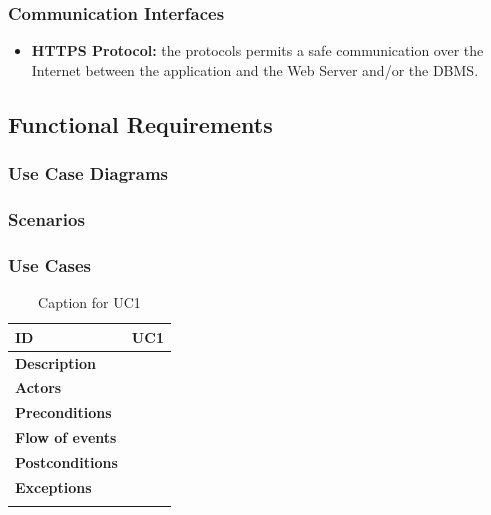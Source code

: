 \documentclass {article}
\begin{document}
	\subsubsection{Communication Interfaces}
	\begin{itemize}
		\item {\bf HTTPS Protocol:} the protocols permits a safe communication over the Internet between the application and the Web Server and/or the DBMS.
	\end{itemize}
	\subsection{Functional Requirements}
	\subsubsection{Use Case Diagrams}
	\subsubsection{Scenarios}
	\subsubsection{Use Cases}
	
	\begin{longtable}{| p{3 cm} | p{8.5 cm} |} 
			\hline
			{\bf ID} & UC1 \\
			\hline
			{\bf Description} & \\
			\hline
			{\bf Actors} & \\
			\hline
			{\bf Preconditions} & 	\\
			\hline
			{\bf Flow of events} &	\\
			\hline
			{\bf Postconditions} & \\
			\hline
			{\bf Exceptions} & 	\\
			\hline
			\caption{Caption for UC1}
			\end{longtable}
			
\end{document}

